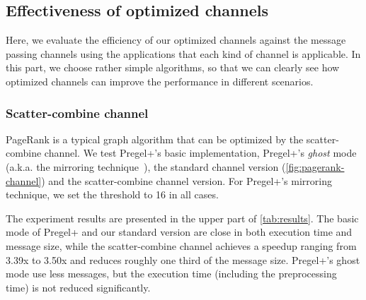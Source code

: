 \documentclass{sokendai_thesis} %
\newcommand{\PP}{Pregel+}
\begin{document}
\subsection{Effectiveness of optimized channels}

Here, we evaluate the efficiency of our optimized channels against the message passing channels using the applications that each kind of channel is applicable.
In this part, we choose rather simple algorithms, so that we can clearly see how optimized channels can improve the performance in different scenarios.

\subsubsection{Scatter-combine channel}
\label{sec:eval-sc}

PageRank is a typical graph algorithm that can be optimized by the scatter-combine channel.
We test \PP{}'s basic implementation, \PP{}'s \textit{ghost} mode (a.k.a. the mirroring technique~\cite{yan2015effective}), the standard channel version (\autoref{fig:pagerank-channel}) and the scatter-combine channel version.
For \PP{}'s mirroring technique, we set the threshold to 16 in all cases.

The experiment results are presented in the upper part of \autoref{tab:results}.
The basic mode of \PP{} and our standard version are close in both execution time and message size, while the scatter-combine channel achieves a speedup ranging from 3.39x to 3.50x and reduces roughly one third of the message size.
\PP{}'s ghost mode use less messages, but the execution time (including the preprocessing time) is not reduced significantly.
\end{document}

